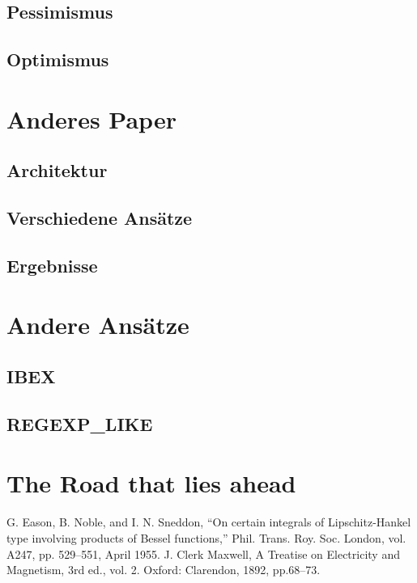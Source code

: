 \documentclass[conference]{IEEEtran}
\begin{document}
\subsection{Pessimismus}

\subsection{Optimismus}

\section{Anderes Paper}

\subsection{Architektur}

\subsection{Verschiedene Ansätze}

\subsection{Ergebnisse}

\section{Andere Ansätze}

\subsection{IBEX}

\subsection{REGEXP\_LIKE}

\section{The Road that lies ahead}

\begin{thebibliography}{00}
     G. Eason, B. Noble, and I. N. Sneddon, ``On certain integrals of Lipschitz-Hankel type involving products of Bessel functions,'' Phil. Trans. Roy. Soc. London, vol. A247, pp. 529--551, April 1955.
     J. Clerk Maxwell, A Treatise on Electricity and Magnetism, 3rd ed., vol. 2. Oxford: Clarendon, 1892, pp.68--73.
\end{thebibliography}
\end{document}
